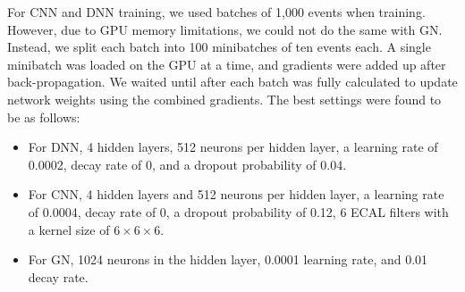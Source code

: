 For CNN and DNN training, we used batches of 1,000 events when training. However, due to GPU memory limitations, we could not do the same with GN. Instead, we split each batch into 100 minibatches of ten events each. A single minibatch was loaded on the GPU at a time, and gradients were added up after back-propagation. We waited until after each batch was fully calculated to update network weights using the combined gradients. The best settings were found to be as follows:

\begin{itemize}
    \item For DNN, 4 hidden layers, 512 neurons per hidden layer, a learning rate of 0.0002, decay rate of 0, and a dropout probability of 0.04.
    \item For CNN, 4 hidden layers and 512 neurons per hidden layer, a learning rate of 0.0004, decay rate of 0, a dropout probability of 0.12, 6 ECAL filters with a kernel size of $6 \times 6 \times 6$.
    \item For GN, 1024 neurons in the hidden layer, 0.0001 learning rate, and 0.01 decay rate. 
\end{itemize}

